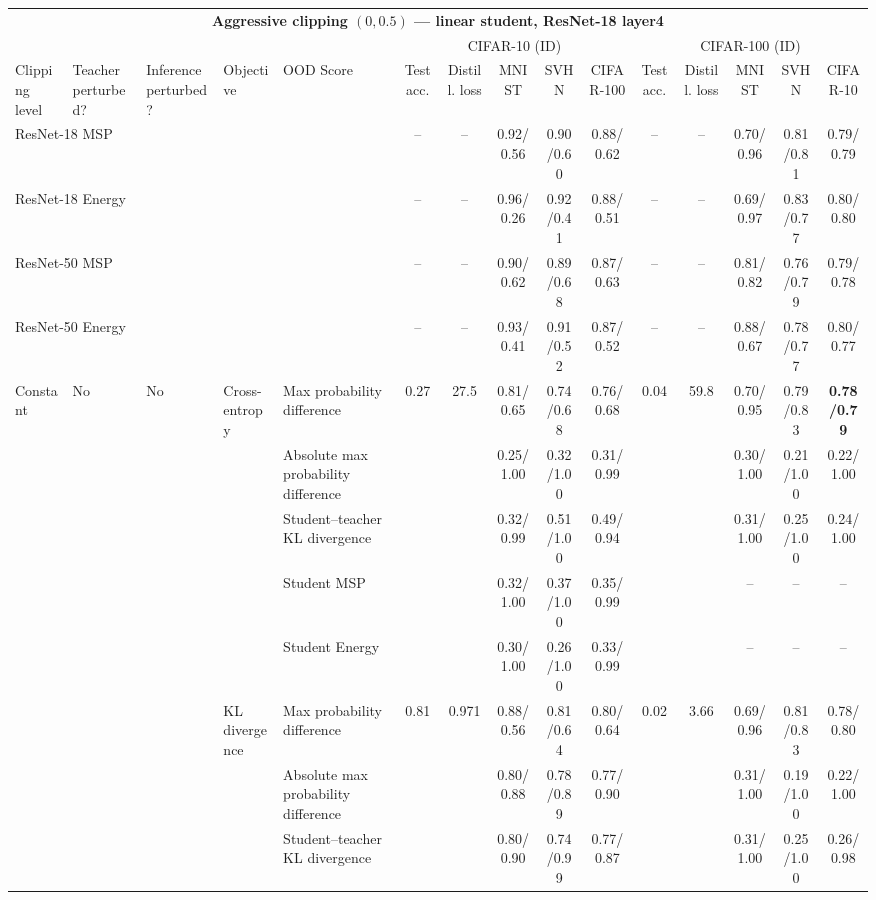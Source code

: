 \documentclass[border=2pt]{standalone}
\begin{document}
\scriptsize
\setlength{\tabcolsep}{4pt}
\begin{tabular}{lllllcccccccccc}
\multicolumn{15}{c}{\textbf{Aggressive clipping $(0, 0.5)$ --- linear student, ResNet-18 layer4}}\\[4pt]
\multicolumn{5}{c}{} & \multicolumn{5}{c}{CIFAR-10 (ID)} & \multicolumn{5}{c}{CIFAR-100 (ID)} \\
\cmidrule(lr){6-10} \cmidrule(lr){11-15}
\toprule
Clipping level & Teacher perturbed? & Inference perturbed? & Objective & OOD Score & Test acc. & Distill. loss & MNIST & SVHN & CIFAR-100 & Test acc. & Distill. loss & MNIST & SVHN & CIFAR-10 \\
\midrule
\multicolumn{5}{l}{ResNet-18 MSP} & -- & -- & 0.92/0.56 & 0.90/0.60 & 0.88/0.62 & -- & -- & 0.70/0.96 & 0.81/0.81 & 0.79/0.79 \\
\multicolumn{5}{l}{ResNet-18 Energy} & -- & -- & 0.96/0.26 & 0.92/0.41 & 0.88/0.51 & -- & -- & 0.69/0.97 & 0.83/0.77 & 0.80/0.80 \\
\multicolumn{5}{l}{ResNet-50 MSP} & -- & -- & 0.90/0.62 & 0.89/0.68 & 0.87/0.63 & -- & -- & 0.81/0.82 & 0.76/0.79 & 0.79/0.78 \\
\multicolumn{5}{l}{ResNet-50 Energy} & -- & -- & 0.93/0.41 & 0.91/0.52 & 0.87/0.52 & -- & -- & 0.88/0.67 & 0.78/0.77 & 0.80/0.77 \\
\midrule
Constant & No & No & Cross-entropy & Max probability difference & 0.27 & 27.5 & 0.81/0.65 & 0.74/0.68 & 0.76/0.68 & 0.04 & 59.8 & 0.70/0.95 & 0.79/0.83 & \textbf{0.78/0.79} \\
 &  &  &  & Absolute max probability difference &  &  & 0.25/1.00 & 0.32/1.00 & 0.31/0.99 &  &  & 0.30/1.00 & 0.21/1.00 & 0.22/1.00 \\
 &  &  &  & Student--teacher KL divergence &  &  & 0.32/0.99 & 0.51/1.00 & 0.49/0.94 &  &  & 0.31/1.00 & 0.25/1.00 & 0.24/1.00 \\
 &  &  &  & Student MSP &  &  & 0.32/1.00 & 0.37/1.00 & 0.35/0.99 &  &  & -- & -- & -- \\
 &  &  &  & Student Energy &  &  & 0.30/1.00 & 0.26/1.00 & 0.33/0.99 &  &  & -- & -- & -- \\
 &  &  & KL divergence & Max probability difference & 0.81 & 0.971 & 0.88/0.56 & 0.81/0.64 & 0.80/0.64 & 0.02 & 3.66 & 0.69/0.96 & 0.81/0.83 & 0.78/0.80 \\
 &  &  &  & Absolute max probability difference &  &  & 0.80/0.88 & 0.78/0.89 & 0.77/0.90 &  &  & 0.31/1.00 & 0.19/1.00 & 0.22/1.00 \\
 &  &  &  & Student--teacher KL divergence &  &  & 0.80/0.90 & 0.74/0.99 & 0.77/0.87 &  &  & 0.31/1.00 & 0.25/1.00 & 0.26/0.98 \\

\end{tabular}
\end{document}
